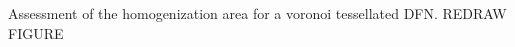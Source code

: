 \label{fig:homoarea} Assessment of the homogenization area for a voronoi tessellated DFN. REDRAW FIGURE